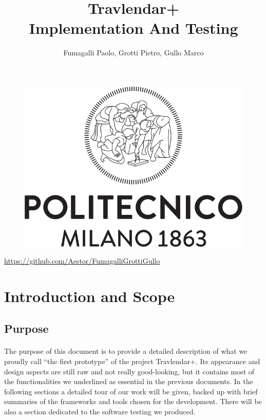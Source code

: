 \documentclass{article}
\title{Travlendar+\\Implementation And Testing}
\author{Fumagalli Paolo, Grotti Pietro, Gullo Marco}
\begin{document}
\begin{figure}[t]
\includegraphics[width=\linewidth]{Images/Logo_Politecnico_Milano.png}
\label{fig:Logo}
\end{figure}
\maketitle
\begin{center}
\large
\href{https://github.com/Aestor/FumagalliGrottiGullo}{https://github.com/Aestor/FumagalliGrottiGullo}
\end{center}
\newpage
{}
\tableofcontents
\newpage
{}
	\section{Introduction and Scope}
		\subsection{Purpose}
			\paragraph{}The purpose of this document is to provide a detailed description of what we proudly call “the first prototype” of the project Travlendar+. Its appearance and design aspects are still raw and not really good-looking, but it contains most of the functionalities we underlined as essential in the previous documents. In the following sections a detailed tour of our work will be given, backed up with brief summaries of the frameworks and tools chosen for the development. There will be also a section dedicated to the software testing we produced.
\end{document}

